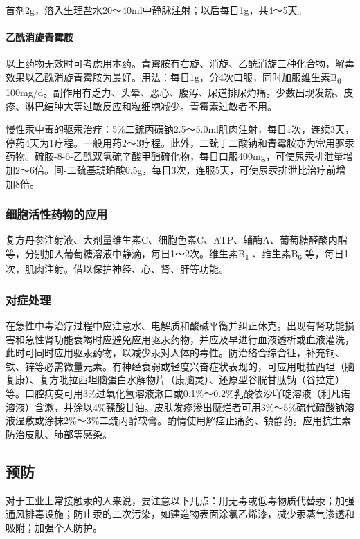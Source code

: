 首剂2g，溶入生理盐水20～40ml中静脉注射；以后每日1g，共4～5天。

\paragraph{乙酰消旋青霉胺}

以上药物无效时可考虑用本药。青霉胺有右旋、消旋、乙酰消旋三种化合物，解毒效果以乙酰消旋青霉胺为最好。用法：每日1g，分4次口服，同时加服维生素B\textsubscript{6}
100mg/d。副作用有乏力、头晕、恶心、腹泻、尿道排尿灼痛。少数出现发热、皮疹、淋巴结肿大等过敏反应和粒细胞减少。青霉素过敏者不用。

慢性汞中毒的驱汞治疗：5\%二巯丙磺钠2.5～5.0ml肌肉注射，每日1次，连续3天，停药4天为1疗程。一般用药2～3疗程。此外，二巯丁二酸钠和青霉胺亦为常用驱汞药物。硫胺-8-6-乙酰双氢硫辛酸甲酯硫化物，每日口服400mg，可使尿汞排泄量增加2～6倍。间-二巯基琥珀酸0.5g，每日3次，连服5天，可使尿汞排泄比治疗前增加8倍。

\subsubsection{细胞活性药物的应用}

复方丹参注射液、大剂量维生素C、细胞色素C、ATP、辅酶A、葡萄糖醛酸内酯等，分别加入葡萄糖溶液中静滴，每日1～2次。维生素B\textsubscript{1}
、维生素B\textsubscript{6}
等，每日1次，肌肉注射。借以保护神经、心、肾、肝等功能。

\subsubsection{对症处理}

在急性中毒治疗过程中应注意水、电解质和酸碱平衡并纠正休克。出现有肾功能损害和急性肾功能衰竭时应避免应用驱汞药物，并应及早进行血液透析或血液灌洗，此时可同时应用驱汞药物，以减少汞对人体的毒性。防治络合综合征，补充铜、铁、锌等必需微量元素。有神经衰弱或轻度兴奋症状表现的，可应用吡拉西坦（脑复康）、复方吡拉西坦脑蛋白水解物片（康脑灵）、还原型谷胱甘肽钠（谷拉定）等。口腔病变可用3\%过氧化氢溶液漱口或0.1\%～0.2\%乳酸依沙吖啶溶液（利凡诺溶液）含漱，并涂以4\%鞣酸甘油。皮肤发疹渗出糜烂者可用3\%～5\%硫代硫酸钠溶液湿敷或涂抹2\%～3\%二巯丙醇软膏。酌情使用解痉止痛药、镇静药。应用抗生素防治皮肤、肺部等感染。

\subsection{预防}

对于工业上常接触汞的人来说，要注意以下几点：用无毒或低毒物质代替汞；加强通风排毒设施；防止汞的二次污染，如建造物表面涂氯乙烯漆，减少汞蒸气渗透和吸附；加强个人防护。

